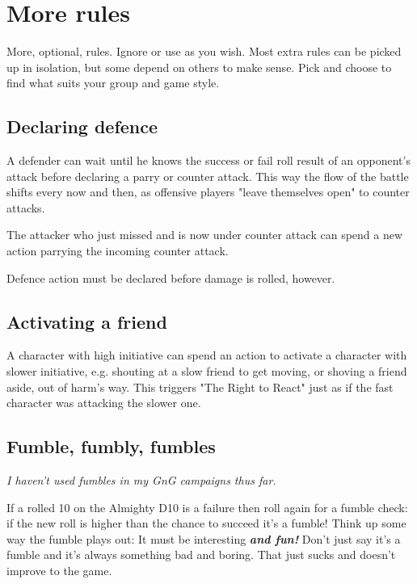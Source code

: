 \section*{More rules}

More, optional, rules. Ignore or use as you wish. Most extra rules can be picked up in isolation, but some depend on others to make sense. Pick and choose to find what suits your group and game style.


\subsection*{Declaring defence}
A defender can wait until he knows the success or fail roll result of an opponent's attack before declaring a parry or counter attack. This way the flow of the battle shifts every now and then, as offensive players "leave themselves open" to counter attacks.

The attacker who just missed and is now under counter attack can spend a new action parrying the incoming counter attack.

Defence action must be declared before damage is rolled, however.


\subsection*{Activating a friend}
A character with high initiative can spend an action to activate a character with slower initiative, e.g. shouting at a slow friend to get moving, or shoving a friend aside, out of harm's way. This triggers "The Right to React" just as if the fast character was attacking the slower one.


\subsection*{Fumble, fumbly, fumbles}
\emph{I haven't used fumbles in my GnG campaigns thus far.}

If a rolled 10 on the Almighty D10 is a failure then roll again for a fumble check: if the new roll is higher than the chance to succeed it's a fumble! Think up some way the fumble plays out: It must be interesting \textit{\textbf{and fun!}} Don't just say it's a fumble and it's always something bad and boring. That just sucks and doesn't improve to the game.

